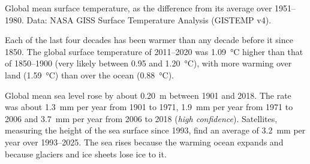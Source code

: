 \begin{omfigure}

{\small Global mean surface temperature, as the difference from its average
over 1951--1980. Data: NASA GISS Surface Temperature Analysis (GISTEMP v4).}
\end{omfigure}

\begin{proposition}\label{prop:g12:climate-change:warming}
Each of the last four decades has been warmer than any decade before it
since 1850. The global surface temperature of 2011--2020 was \qty{1.09}{\degreeCelsius}
higher than that of 1850--1900 (very likely between 0.95 and
\qty{1.20}{\degreeCelsius}), with more warming over land
(\qty{1.59}{\degreeCelsius}) than over the ocean (\qty{0.88}{\degreeCelsius}).
\end{proposition}

\begin{proposition}\label{prop:g12:climate-change:sea}
Global mean sea level rose by about \qty{0.20}{m} between 1901 and 2018.
The rate was about \qty{1.3}{mm} per year from 1901 to 1971,
\qty{1.9}{mm} per year from 1971 to 2006 and \qty{3.7}{mm} per year from
2006 to 2018 (\emph{high confidence}). Satellites, measuring the height of
the sea surface since 1993, find an average of \qty{3.2}{mm} per year over
1993--2025. The sea rises because the warming ocean expands and because
glaciers and ice sheets lose ice to it.
\end{proposition}

